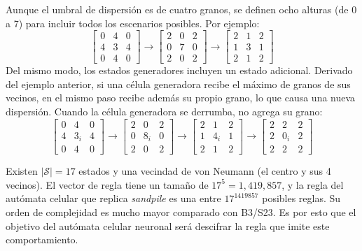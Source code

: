 Aunque el umbral de dispersión es de cuatro granos, se definen ocho alturas (de 0 a 7) para incluir todos los escenarios posibles. Por ejemplo: 
\[
\left[\begin{matrix}
	0 & 4 & 0 \\
	4 & 3 & 4 \\
	0 & 4 & 0
\end{matrix}\right] \rightarrow
\left[\begin{matrix}
	2 & 0 & 2 \\
	0 & 7 & 0 \\
	2 & 0 & 2
\end{matrix}\right] \rightarrow
\left[\begin{matrix}
	2 & 1 & 2 \\
	1 & 3 & 1 \\
	2 & 1 & 2
\end{matrix}\right]
\]
Del mismo modo, los estados generadores incluyen un estado adicional. Derivado del ejemplo anterior, si una célula generadora recibe el máximo de granos de sus vecinos, en el mismo paso recibe además su propio grano, lo que causa una nueva dispersión. Cuando la célula generadora se derrumba, no agrega su grano:
\[
\left[\begin{matrix}
	0 & 4 & 0 \\
	4 & 3_i & 4 \\
	0 & 4 & 0
\end{matrix}\right] \rightarrow
\left[\begin{matrix}
	2 & 0 & 2 \\
	0 & 8_i & 0 \\
	2 & 0 & 2
\end{matrix}\right] \rightarrow
\left[\begin{matrix}
	2 & 1 & 2 \\
	1 & 4_i & 1 \\
	2 & 1 & 2
\end{matrix}\right] \rightarrow
\left[\begin{matrix}
	2 & 2 & 2 \\
	2 & 0_i & 2 \\
	2 & 2 & 2
\end{matrix}\right]
\]

Existen $|\mathcal{S}| = 17$ estados y una vecindad de von Neumann (el centro y sus 4 vecinos). El vector de regla tiene un tamaño de $17^5 = 1{,}419{,}857$, y la regla del autómata celular que replica \textit{sandpile} es una entre $17^{1419857}$ posibles reglas. Su orden de complejidad es mucho mayor comparado con B3/S23. Es por esto que el objetivo del autómata celular neuronal será descifrar la regla que imite este comportamiento.

